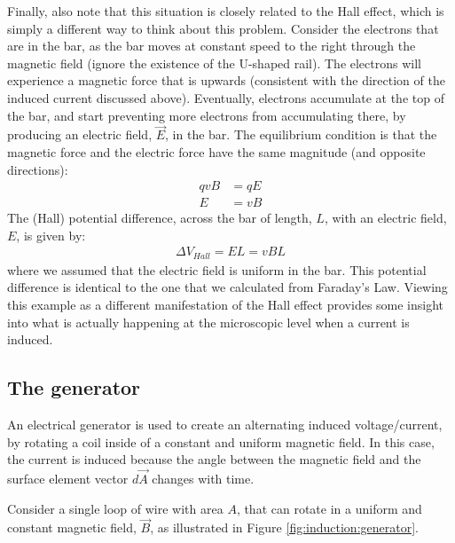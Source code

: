 Finally, also note that this situation is closely related to the Hall effect, which is simply a different way to think about this problem. Consider the electrons that are in the bar, as the bar moves at constant speed to the right through the magnetic field (ignore the existence of the U-shaped rail). The electrons will experience a magnetic force that is upwards (consistent with the direction of the induced current discussed above). Eventually, electrons accumulate at the top of the bar, and start preventing more electrons from accumulating there, by producing an electric field, $\vec E$, in the bar. The equilibrium condition is that the magnetic force and the electric force have the same magnitude (and opposite directions):
\begin{align*}
qvB &= qE\\
E &= vB
\end{align*}
The (Hall) potential difference, across the bar of length, $L$, with an electric field, $E$, is given by:
\begin{align*}
\Delta V_{Hall} = EL = vBL
\end{align*}
where we assumed that the electric field is uniform in the bar. This potential difference is identical to the one that we calculated from Faraday's Law. Viewing this example as a different manifestation of the Hall effect provides some insight into what is actually happening at the microscopic level when a current is induced. 
\subsection{The generator}
An electrical generator is used to create an alternating induced voltage/current, by rotating a coil inside of a constant and uniform magnetic field. In this case, the current is induced because the angle between the magnetic field and the surface element vector $d\vec A$ changes with time.

Consider a single loop of wire with area $A$, that can rotate in a uniform and constant magnetic field, $\vec B$, as illustrated in Figure \ref{fig:induction:generator}. 

